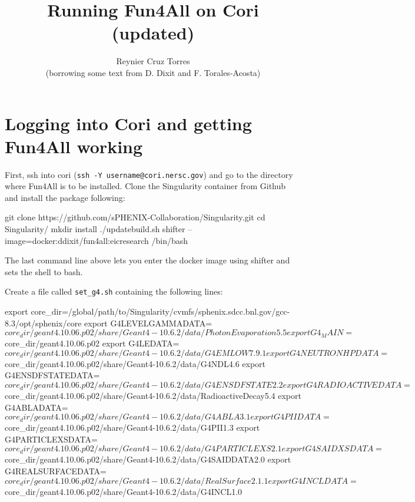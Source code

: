 \documentclass[12pt]{article}
\title{Running Fun4All on Cori (updated)}
\author{Reynier Cruz Torres \\ (borrowing some text from D. Dixit and F. Torales-Acosta)}
\begin{document}
\maketitle

\tableofcontents

\newpage
\section{Logging into Cori and getting Fun4All working}

First, ssh into cori (\verb|ssh -Y username@cori.nersc.gov|) and go to the directory where Fun4All is to be installed.
Clone the Singularity container from Github and install the package following:

\begin{tcolorbox}
\begin{verbnobox}[\scriptsize]
git clone https://github.com/sPHENIX-Collaboration/Singularity.git
cd Singularity/
mkdir install
./updatebuild.sh
shifter --image=docker:ddixit/fun4all:eicresearch /bin/bash
\end{verbnobox}  
\end{tcolorbox}

The last command line above lets you enter the docker image using shifter and sets the shell to bash.

Create a file called \verb|set_g4.sh| containing the following lines:

\begin{tcolorbox}
\begin{verbnobox}[\scriptsize]
export core_dir=/global/path/to/Singularity/cvmfs/sphenix.sdcc.bnl.gov/gcc-8.3/opt/sphenix/core
export G4LEVELGAMMADATA=$core_dir/geant4.10.06.p02/share/Geant4-10.6.2/data/PhotonEvaporation5.5
export G4_MAIN=$core_dir/geant4.10.06.p02
export G4LEDATA=$core_dir/geant4.10.06.p02/share/Geant4-10.6.2/data/G4EMLOW7.9.1
export G4NEUTRONHPDATA=$core_dir/geant4.10.06.p02/share/Geant4-10.6.2/data/G4NDL4.6
export G4ENSDFSTATEDATA=$core_dir/geant4.10.06.p02/share/Geant4-10.6.2/data/G4ENSDFSTATE2.2
export G4RADIOACTIVEDATA=$core_dir/geant4.10.06.p02/share/Geant4-10.6.2/data/RadioactiveDecay5.4
export G4ABLADATA=$core_dir/geant4.10.06.p02/share/Geant4-10.6.2/data/G4ABLA3.1
export G4PIIDATA=$core_dir/geant4.10.06.p02/share/Geant4-10.6.2/data/G4PII1.3
export G4PARTICLEXSDATA=$core_dir/geant4.10.06.p02/share/Geant4-10.6.2/data/G4PARTICLEXS2.1
export G4SAIDXSDATA=$core_dir/geant4.10.06.p02/share/Geant4-10.6.2/data/G4SAIDDATA2.0
export G4REALSURFACEDATA=$core_dir/geant4.10.06.p02/share/Geant4-10.6.2/data/RealSurface2.1.1
export G4INCLDATA=$core_dir/geant4.10.06.p02/share/Geant4-10.6.2/data/G4INCL1.0
\end{verbnobox}  
\end{tcolorbox}
\end{document}
